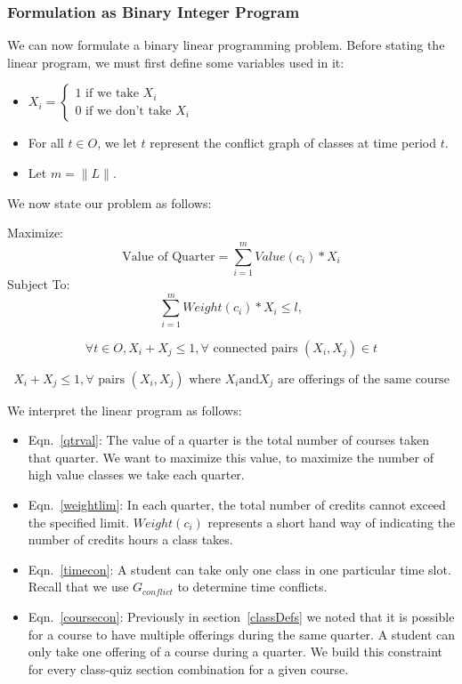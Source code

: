 \documentclass[11pt]{article} %
\begin{document}
\subsubsection{Formulation as Binary Integer Program} We can now formulate
a binary linear programming problem.  Before stating the linear
program, we must first define some variables used in it: 

\begin{itemize}
    \item $ X_i = \left\{ \begin{array}{lr} 1 \text{ if we take } X_i\\ 0 \text{ if
we don't take } X_i \end{array} \right.  $ 
    \item For all $t \in O$, we let $t$ represent the conflict graph of classes
    at time period $t$.
    \item Let $m = \|L\|$.  
\end{itemize} 
We now state our problem as follows: 

Maximize: 
\begin{equation}
    \text{Value of Quarter} = \sum_{i=1}^m Value(c_i) * X_i
    \label{qtrval}
\end{equation}
Subject To:
\begin{equation}
    \sum_{i=1}^m Weight(c_i) * X_i \leq l, 
    \label{weightlim}
\end{equation}

\begin{equation}
    \forall t \in O,X_i+X_j \leq 1, \forall \text{ connected pairs } (X_i,X_j) \in t
    \label{timecon}
\end{equation}

\begin{equation}
   X_i + X_j \leq 1, \forall \text{ pairs } (X_i,X_j) \text{ where } X_i \text{and} X_j \text{ are offerings of
   the same course}
    \label{coursecon}
\end{equation}

We interpret the linear program as follows: \begin{itemize} \item
Eqn.~\ref{qtrval}: The value of a quarter is the total number of courses taken
that quarter.  We want to maximize this value, to maximize the number of high
value classes we take each quarter.  \item Eqn.~\ref{weightlim}: In each quarter,
the total number of credits cannot exceed the specified limit.  $Weight(c_i)$
represents a short hand way of indicating the number of credits hours a class
takes.  \item Eqn.~\ref{timecon}: A student can take only one class in one particular
time slot.  Recall that we use $G_{conflict}$ to determine time conflicts.
\item Eqn.~\ref{coursecon}: Previously in
section~\ref{classDefs} we noted that it is possible for a course to have multiple
offerings during the same quarter.  A student can only take one offering
of a course during a quarter.  We build this constraint for every class-quiz section
combination for a given course.\end{itemize}
\end{document}
